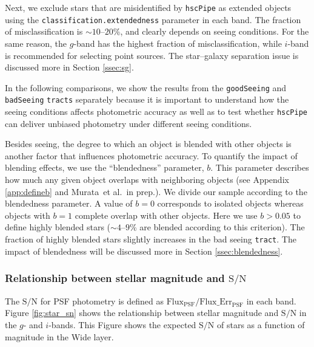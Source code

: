 \documentclass[useamsfonts]{pasj01}
\def\etal{{\ et al.~}}
\def\hscpipe{\texttt{hscPipe}}
\def\tract{\texttt{tract}}
\def\tracts{\texttt{tracts}}
\def\s2n{{$\mathrm{S}/\mathrm{N}$}}
\begin{document}
    Next, we exclude stars that are misidentified by \hscpipe{} as extended
    objects using the \texttt{classification.extendedness} parameter in each band.
    The fraction of misclassification is ${\sim}10$--$20$\%, and clearly depends on
    seeing conditions.
    For the same reason, the $g$-band has the highest fraction of misclassification,
    while $i$-band is recommended for selecting point sources.
    The star--galaxy separation issue is discussed more in Section \ref{ssec:sg}.

    In the following comparisons, we show the results from the
    \texttt{goodSeeing} and \texttt{badSeeing} \tracts{} separately because it
    is important to understand how the seeing conditions affects photometric accuracy 
    as well as to test whether \hscpipe{} can deliver unbiased photometry under 
    different seeing conditions.
    
    Besides seeing, the degree to which an object is blended with other objects 
    is another factor that influences photometric accuracy. 
    To quantify the impact of blending effects, we use the ``blendedness'' 
    parameter, $b$. 
    This parameter describes how much any given object overlaps with neighboring 
    objects (see Appendix \ref{app:defineb} and Murata\etal in prep.). 
    We divide our sample according to the blendedness parameter. 
    A value of $b=0$ corresponds to isolated objects whereas objects with $b=1$ 
    complete overlap with other objects. 
    Here we use $b>0.05$ to define highly blended stars (${\sim}4$--$9$\% are blended
    according to this criterion).
    The fraction of highly blended stars slightly increases in the bad seeing \tract{}. 
    The impact of blendedness will be discussed more in Section \ref{ssec:blendedness}.

\subsubsection{Relationship between stellar magnitude and \s2n{}}

    The \s2n{} for PSF photometry is defined as
    $\mathrm{Flux}_{\mathrm{PSF}}/\mathrm{Flux\_Err}_{\mathrm{PSF}}$ in each band. 
    Figure \ref{fig:star_sn} shows the relationship between stellar magnitude and \s2n{} 
    in the $g$- and $i$-bands. 
    This Figure shows the expected \s2n{} of stars as a function of magnitude in the 
    Wide layer.
    
\end{document}
